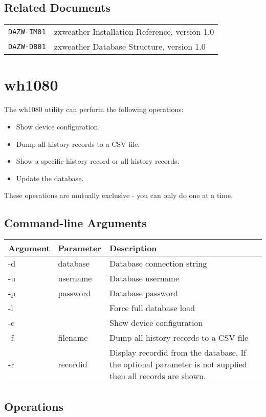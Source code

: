 \documentclass[a4paper,10pt,draft]{book}
\begin{document}
\section{Related Documents}
\begin{tabular}{l l}
\verb|DAZW-IM01| & zxweather Installation Reference, version 1.0 \\
\verb|DAZW-DB01| & zxweather Database Structure, version 1.0 \\
\end{tabular}

\chapter{wh1080}

The wh1080 utility can perform the following operations:
\begin{itemize}
\item Show device configuration.
\item Dump all history records to a CSV file.
\item Show a specific history record or all history records.
\item Update the database.
\end{itemize}
These operations are mutually exclusive - you can only do one at a time.

\section{Command-line Arguments}
\begin{tabular}{l l p{10cm}}
\hline
\textbf{Argument} & \textbf{Parameter} & \textbf{Description} \\
\hline
-d & database & Database connection string \\
-u & username & Database username \\
-p & password & Database password \\
-l &  & Force full database load \\
-c &  & Show device configuration \\
-f & filename & Dump all history records to a CSV file \\
-r & recordid & Display recordid from the database. If the optional parameter is not supplied then all records are shown. \\
\hline
\end{tabular}

\section{Operations}
\end{document}
